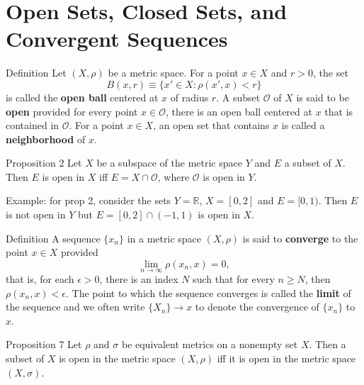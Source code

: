 \section{Open Sets, Closed Sets, and Convergent Sequences}
\begin{namedthm*}{Definition}
    Let $(X,\rho)$ be a metric space. For a point $x\in X$ and $r>0$, the set 
    \[
        B(x,r)\equiv\{x'\in X:\rho(x',x)<r\}
    \]
    is called the \textbf{open ball} centered at $x$ of radius $r$.
    A subset $\mathcal{O}$ of $X$ is said to be \textbf{open} provided for every point $x\in\mathcal{O}$, there is an open ball centered at $x$ that is contained in $\mathcal{O}$.
    For a point $x\in X$, an open set that contains $x$ is called a \textbf{neighborhood} of $x$.
\end{namedthm*}

\begin{namedthm*}{Proposition 2}
    Let $X$ be a subspace of the metric space $Y$ and $E$ a subset of $X$.
    Then $E$ is open in $X$ iff $E=X\cap\mathcal{O}$, where $\mathcal{O}$ is open in $Y$.
\end{namedthm*}
Example: for prop 2, consider the sets $Y=\mathbb{R}$, $X=[0,2]$ and $E=[0,1)$.
Then $E$ is not open in $Y$ but $E=[0,2]\cap(-1,1)$ is open in $X$.

\begin{namedthm*}{Definition}
    A sequence $\{x_n\}$ in a metric space $(X,\rho)$ is said to \textbf{converge} to the point $x\in X$ provided
    \[
        \lim_{n\to\infty}\rho(x_n,x)=0,
    \]
    that is, for each $\epsilon>0$, there is an index $N$ such that for every $n\ge N$, then $\rho(x_n,x)<\epsilon$.
    The point to which the sequence converges is called the \textbf{limit} of the sequence and we often write $\{X_n\}\to x$ to denote the convergence of $\{x_n\}$ to $x$.
\end{namedthm*}

\begin{namedthm*}{Proposition 7}
    Let $\rho$ and $\sigma$ be equivalent metrics on a nonempty set $X$.
    Then a subset of $X$ is open in the metric space $(X,\rho)$ iff it is open in the metric space $(X,\sigma)$.
\end{namedthm*}


